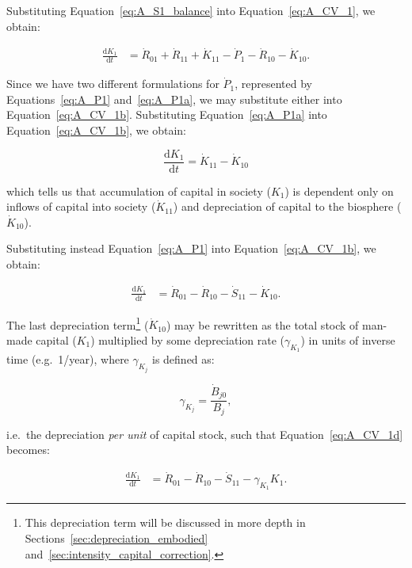 Substituting Equation~\ref{eq:A_S1_balance} 
into Equation~\ref{eq:A_CV_1}, we obtain:

\begin{align}\label{eq:A_CV_1b}
	\frac{\mathrm{d}K_{1}}{\mathrm{d}t}		&
	= \dot{R}_{01} 
	+ \dot{R}_{11}
	+ \dot{K}_{11}
	- \dot{P}_{1}				
	- \dot{R}_{10}				
	- \dot{K}_{10}.
\end{align}

Since we have two different formulations for $\dot{P}_{1}$,
represented by Equations~\ref{eq:A_P1} and~\ref{eq:A_P1a}, 
we may substitute either into Equation~\ref{eq:A_CV_1b}.
Substituting Equation~\ref{eq:A_P1a} 
into Equation~\ref{eq:A_CV_1b}, we obtain:

\begin{equation}\label{eq:A_CV_1c}
	\frac{\mathrm{d}K_{1}}{\mathrm{d}t}		
	= \dot{K}_{11}
	- \dot{K}_{10}
\end{equation}

\noindent{}which tells us that accumulation of capital in society 
($K_{1}$) is dependent only on inflows of capital into society ($\dot{K}_{11}$) 
and depreciation of capital to the biosphere ($\dot{K}_{10}$).

Substituting instead Equation~\ref{eq:A_P1} 
into Equation~\ref{eq:A_CV_1b}, we obtain:

 \begin{align}\label{eq:A_CV_1d}
	\frac{\mathrm{d}K_{1}}{\mathrm{d}t}		&
	= \dot{R}_{01} 
	- \dot{R}_{10}
	- \dot{S}_{11}
	- \dot{K}_{10}.
\end{align}

The last depreciation term\footnote{This
depreciation term will be discussed in more depth in
Sections~\ref{sec:depreciation_embodied} and~\ref{sec:intensity_capital_correction}.} 
($\dot{K}_{10}$)
may be rewritten as the total stock
of man-made capital ($K_{1}$) 
multiplied by some depreciation rate ($\gamma_{K_{1}}$)
in units of inverse time (e.g.\ 1/year),
where $\gamma_{K_{j}}$ is defined as:

\begin{equation}\label{eq:def_gamma}
\gamma_{K_{j}} = \frac{\dot{B}_{j0}}{B_{j}},
\end{equation}

\noindent{}i.e.\ the depreciation \emph{per unit}
of capital stock,
such that Equation~\ref{eq:A_CV_1d} becomes:

 \begin{align}\label{eq:A_CV_1e}
	\frac{\mathrm{d}K_{1}}{\mathrm{d}t}		&
	= \dot{R}_{01} 
	- \dot{R}_{10}
	- \dot{S}_{11}
	- \gamma_{K_{1}}{K}_{1}.
\end{align}


